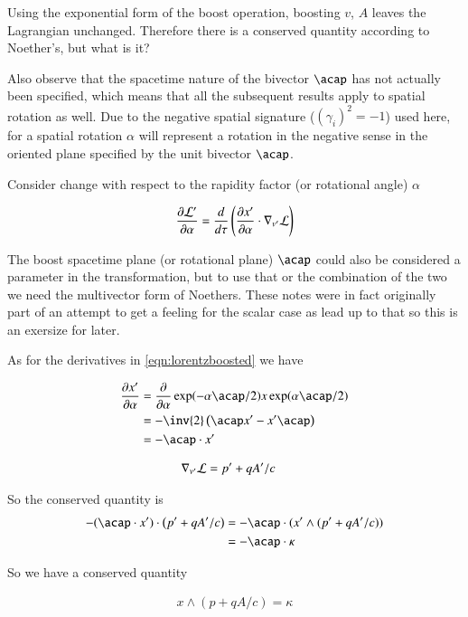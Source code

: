 \documentclass{article}      %
\begin{document}
Using the exponential form of the boost operation, boosting $v$, $A$ leaves the Lagrangian unchanged.
Therefore there is a conserved quantity according to Noether's, but what is it?

Also observe that the spacetime nature of the bivector $\acap$ has not actually been specified, which means that all the
subsequent results apply to spatial rotation as well.  Due to the negative spatial signature ($(\gamma_i)^2=-1$) used here, for a spatial rotation $\alpha$ will represent a rotation in the negative sense in the oriented plane specified by the unit bivector $\acap$.

Consider change with respect to the rapidity factor (or rotational angle) $\alpha$

\begin{align}\label{eqn:lorentzboosted}
\frac{\partial {\mathcal{L}'}}{\partial {\alpha}} = \frac{d}{d\tau} \left( \frac{\partial {x'}}{\partial {\alpha}} \cdot \nabla_{v'} \mathcal{L} \right)
\end{align}

The boost spacetime plane (or rotational plane) $\acap$ could also be considered a parameter in the transformation, but to use that or the combination of the
two we need the multivector form of Noethers.  These notes were in fact originally part of an attempt \cite{PJEulerLagrange}
to get a feeling for the scalar case as lead up to that so this is an exersize for later.

As for the derivatives in \ref{eqn:lorentzboosted} we have

\begin{align*}
\PD{\alpha}{x'} 
&= \PD{\alpha}{} \exp(-\alpha \acap/2) x \exp(\alpha \acap/2) \\
&= -\inv{2} \left(\acap x' - x'\acap\right) \\
&= - \acap \cdot x' \\
\end{align*}

\begin{align*}
\nabla_{v'} \mathcal{L} &= p' + qA'/c
\end{align*}

So the conserved quantity is
\begin{align*}
- (\acap \cdot x') \cdot \left( p' + qA'/c \right)
&= - \acap \cdot (x' \wedge (p' + qA'/c ) ) \\
&= -\acap \cdot \kappa
\end{align*}

So we have a conserved quantity

\begin{align*}
x \wedge (p + qA/c ) = \kappa
\end{align*}
\end{document}
